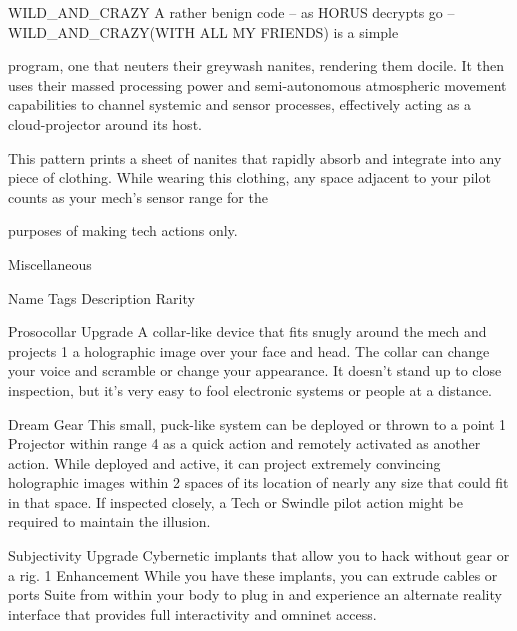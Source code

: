 WILD\_AND\_CRAZY  
A rather benign code -- as HORUS decrypts go -- WILD\_AND\_CRAZY(WITH ALL MY FRIENDS) is a simple  

program, one that neuters their greywash nanites, rendering them docile. It then uses their massed  
processing power and semi-autonomous atmospheric movement capabilities to channel systemic and  
sensor processes, effectively acting as a cloud-projector around its host.   

This pattern prints a sheet of nanites that rapidly absorb and integrate into any piece of clothing. While  
wearing this clothing, any space adjacent to your pilot counts as your mech’s sensor range for the  

purposes of making tech actions only. 
 

                                                 Miscellaneous 

 Name                Tags        Description                                                               Rarity 

 Prosocollar         Upgrade     A collar-like device that fits snugly around the mech and projects         1 
                                 a holographic image over your face and head. The collar can  
                                 change your voice and scramble or change your appearance. It  
                                 doesn’t stand up to close inspection, but it’s very easy to fool  
                                 electronic systems or people at a distance. 

                                                                                                               


Dream                 Gear         This small, puck-like system can be deployed or thrown to a point                 1 
Projector                          within range 4 as a quick action and remotely activated as another  
                                   action. While deployed and active, it can project extremely  
                                   convincing holographic images within 2 spaces of its location of  
                                   nearly any size that could fit in that space. If inspected closely, a  
                                   Tech or Swindle pilot action might be required to maintain the  
                                   illusion. 

Subjectivity          Upgrade      Cybernetic implants that allow you to hack without gear or a rig.                 1 
Enhancement                        While you have these implants, you can extrude cables or ports  
Suite                              from within your body to plug in and experience an alternate  
                                   reality interface that provides full interactivity and omninet access. 

